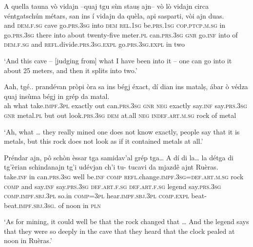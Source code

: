 \begin{linenumbers}
\gll A quella tauna vò vidajn –quaj tgu sùn stauṣ ajn– vò lò vidajn circa véntgatschún métars, san ins í vidajn da quèla, api sasparti, vòi ajn duas.   \\
and  \textsc{dem.f.sg} cave go.\textsc{prs.3sg} into \textsc{dem} \textsc{rel.1sg} be.\textsc{prs.1sg} \textsc{cop.ptcp.m.sg} in  go.\textsc{prs.3sg} there into about twenty-five meter.\textsc{pl} can.\textsc{prs.3sg} \textsc{gnr} go.\textsc{inf} into of \textsc{dem.f.sg} and \textsc{refl}.divide.\textsc{prs.3sg.expl} go.\textsc{prs.3sg.expl} in two  \\
\end{linenumbers}
\medskip
\glt `And this cave – [judging from] what I have been into it – one can go into it about 25 meters, and then it splits into two.'
\medskip

\begin{linenumbers}
\gll   Aah, tgé.. prandévan pròpi òra sa ins bégj éxact, dí dian ins matalṣ, ábar ò védza quaj insùma bégj in grép da matal. \\
ah what take.\textsc{impf.3pl} exactly out can.\textsc{prs.3sg} \textsc{gnr} \textsc{neg} exactly say.\textsc{inf} say.\textsc{prs.3sg} \textsc{gnr}  metal.\textsc{pl} but out look.\textsc{prs.3sg} \textsc{dem} at.all \textsc{neg} \textsc{indef.art.m.sg} rock of metal \\
\end{linenumbers}
\medskip
\glt `Ah, what … they really mined one does not know exactly, people say that it is metals, but this rock does not look as if it contained metals at all.'
\medskip

\begin{linenumbers}
\gll Préndar ajn, pô schòn èssar tga samidav’al grép tga…  A dí di la… la détga di tg’èrian schindanajn tg'i udévjan ch’i tu- tucavi da mjazdê ajnt Ruèras.   \\
take.\textsc{inf} in can.\textsc{prs.3sg} well be.\textsc{inf}  \textsc{comp}  \textsc{refl}.change.\textsc{impf.3sg=def.art.m.sg} rock   \textsc{comp} and  say.\textsc{inf} say.\textsc{prs.3sg}  \textsc{def.art.f.sg}  \textsc{def.art.f.sg} legend say.\textsc{prs.3sg}  \textsc{comp.impf.sbj.3pl} so.in \textsc{comp=3pl}  hear.\textsc{impf.sbj.3pl}  \textsc{comp.expl} beat-  beat.\textsc{impf.sbj.3sg.} of noon in \textsc{pln}  \\
\end{linenumbers}
\medskip
\glt `As for mining, it could well be that the rock changed that … And the legend says that they were so deeply in the cave that they heard that the clock pealed at noon in Ruèras.'
\medskip

